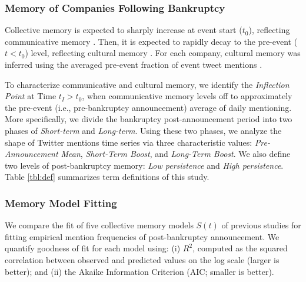 \documentclass[9pt,twocolumn,twoside,lineno]{pnas-new}
\begin{document}
\subsubsection*{Memory of Companies Following Bankruptcy}
\label{sec:measurments}
Collective memory is expected to sharply increase at event start ($t_0$), reflecting communicative memory  \cite{west2021postmortem}.
Then, it is expected to rapidly decay to the pre-event ($t < t_0$) level, reflecting cultural memory \cite{west2021postmortem}.
For each company, cultural memory was inferred using the averaged pre-event fraction of event tweet mentions \cite{west2021postmortem}.

To characterize communicative and cultural memory, we identify the \textit{Inflection Point} at Time $t_I > t_0$, when communicative memory levels off to approximately the pre-event (i.e., pre-bankruptcy announcement) average of daily mentioning.
More specifically, we divide the bankruptcy post-announcement period into two phases of \textit{Short-term} and \textit{Long-term}.
Using these two phases, we analyze the shape of Twitter mentions time series via three characteristic values: \textit{Pre-Announcement Mean}, \textit{Short-Term Boost}, and \textit{Long-Term Boost}.
We also define two levels of post-bankruptcy memory: \textit{Low persistence} and \textit{High persistence}.
Table \ref{tbl:def} summarizes term definitions of this study.


\subsubsection*{Memory Model Fitting}
We compare the fit of five collective memory models $S(t)$ of previous studies \cite{candia2019universal,wang2013quantifying,higham2017fame,garcia2016dynamics,rubin1996one} for fitting empirical mention frequencies of post-bankruptcy announcement.
We quantify goodness of fit for each model using: (i) $R^2$, computed as the squared correlation between observed and predicted values on the log scale (larger is better); and (ii) the Akaike Information Criterion (AIC; smaller is better).
\end{document}
